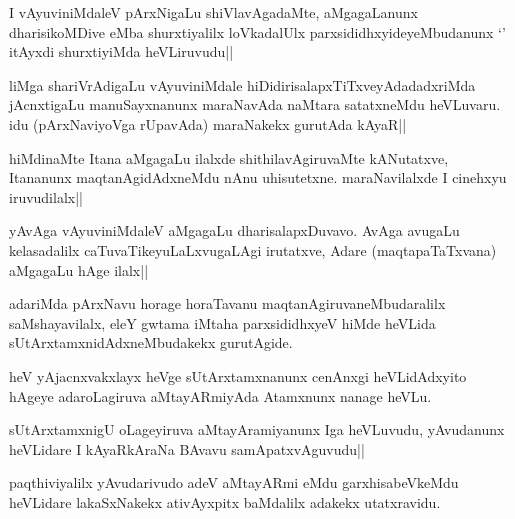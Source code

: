 \begin{artha}%
I vAyuviniMdaleV pArxNigaLu shiVlavAgadaMte, aMgagaLanunx dharisikoMDive eMba shurxtiyalilx loVkadalUlx parxsididhxyideyeMbudanunx `\stext ' itAyxdi shurxtiyiMda heVLiruvudu||
\end{artha}


\begin{artha}
liMga shariVrAdigaLu vAyuviniMdale hiDidirisalapxTiTxveyAdadadxriMda jAcnxtigaLu manuSayxnanunx maraNavAda naMtara satatxneMdu heVLuvaru. idu (pArxNaviyoVga rUpavAda) maraNakekx gurutAda kAyaR||
\end{artha}


\begin{artha}
hiMdinaMte Itana aMgagaLu ilalxde shithilavAgiruvaMte kANutatxve, Itananunx maqtanAgidAdxneMdu nAnu uhisutetxne. maraNavilalxde I cinehxyu iruvudilalx||
\end{artha}

\begin{artha}
yAvAga vAyuviniMdaleV aMgagaLu dharisalapxDuvavo. AvAga avugaLu kelasadalilx caTuvaTikeyuLaLxvugaLAgi irutatxve, Adare (maqtapaTaTxvana) aMgagaLu hAge ilalx||
\end{artha}

\begin{artha}%
adariMda pArxNavu horage horaTavanu maqtanAgiruvaneMbudaralilx saMshayavilalx, eleY gwtama iMtaha parxsididhxyeV hiMde heVLida sUtArxtamxnidAdxneMbudakekx gurutAgide.
\end{artha}

\begin{artha}
heV yAjacnxvakxlayx heVge sUtArxtamxnanunx cenAnxgi heVLidAdxyito hAgeye adaroLagiruva aMtayARmiyAda Atamxnunx nanage heVLu.
\end{artha}


\begin{artha}
sUtArxtamxnigU oLageyiruva aMtayAramiyanunx Iga heVLuvudu, yAvudanunx heVLidare I kAyaRkAraNa BAvavu samApatxvAguvudu||
\end{artha}


\begin{artha}
paqthiviyalilx yAvudarivudo adeV aMtayARmi eMdu garxhisabeVkeMdu heVLidare lakaSxNakekx ativAyxpitx baMdalilx adakekx utatxravidu.
\end{artha}

